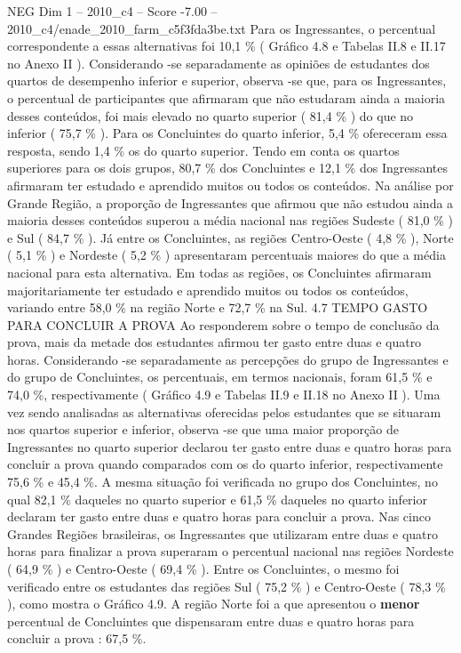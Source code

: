\begin{textsample}{NEG Dim 1 – 2010\_c4 – Score -7.00 – 2010\_c4/enade\_2010\_farm\_c5f3fda3be.txt}
Para os Ingressantes, o percentual correspondente a essas alternativas foi 10,1 \% ( Gráfico 4.8 e Tabelas II.8 e II.17 no Anexo II ).
Considerando -se separadamente as opiniões de estudantes dos quartos de desempenho inferior e superior, observa -se que, para os Ingressantes, o percentual de participantes que afirmaram que não estudaram ainda a maioria desses conteúdos, foi mais elevado no quarto superior ( 81,4 \% ) do que no inferior ( 75,7 \% ).
Para os Concluintes do quarto inferior, 5,4 \% ofereceram essa resposta, sendo 1,4 \% os do quarto superior.
Tendo em conta os quartos superiores para os dois grupos, 80,7 \% dos Concluintes e 12,1 \% dos Ingressantes afirmaram ter estudado e aprendido muitos ou todos os conteúdos.
Na análise por Grande Região, a proporção de Ingressantes que afirmou que não estudou ainda a maioria desses conteúdos superou a média nacional nas regiões Sudeste ( 81,0 \% ) e Sul ( 84,7 \% ).
Já entre os Concluintes, as regiões Centro-Oeste ( 4,8 \% ), Norte ( 5,1 \% ) e Nordeste ( 5,2 \% ) apresentaram percentuais maiores do que a média nacional para esta alternativa.
Em todas as regiões, os Concluintes afirmaram majoritariamente ter estudado e aprendido muitos ou todos os conteúdos, variando entre 58,0 \% na região Norte e 72,7 \% na Sul. 4.7 TEMPO GASTO PARA CONCLUIR A PROVA Ao responderem sobre o tempo de conclusão da prova, mais da metade dos estudantes afirmou ter gasto entre duas e quatro horas.
Considerando -se separadamente as percepções do grupo de Ingressantes e do grupo de Concluintes, os percentuais, em termos nacionais, foram 61,5 \% e 74,0 \%, respectivamente ( Gráfico 4.9 e Tabelas II.9 e II.18 no Anexo II ).
Uma vez sendo analisadas as alternativas oferecidas pelos estudantes que se situaram nos quartos superior e inferior, observa -se que uma maior proporção de Ingressantes no quarto superior declarou ter gasto entre duas e quatro horas para concluir a prova quando comparados com os do quarto inferior, respectivamente 75,6 \% e 45,4 \%.
A mesma situação foi verificada no grupo dos Concluintes, no qual 82,1 \% daqueles no quarto superior e 61,5 \% daqueles no quarto inferior declaram ter gasto entre duas e quatro horas para concluir a prova.
Nas cinco Grandes Regiões brasileiras, os Ingressantes que utilizaram entre duas e quatro horas para finalizar a prova superaram o percentual nacional nas regiões Nordeste ( 64,9 \% ) e Centro-Oeste ( 69,4 \% ).
Entre os Concluintes, o mesmo foi verificado entre os estudantes das regiões Sul ( 75,2 \% ) e Centro-Oeste ( 78,3 \% ), como mostra o Gráfico 4.9.
A região Norte foi a que apresentou o \textbf{menor} percentual de Concluintes que dispensaram entre duas e quatro horas para concluir a prova : 67,5 \%.

\end{textsample}
